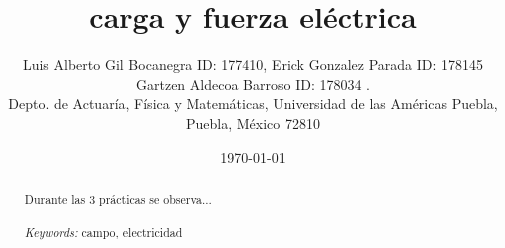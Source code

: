 \documentclass{article}
\begin{document}

\renewcommand{\footrulewidth}{1pt}
\renewcommand{\tablename}{Tabla}
\renewcommand{\figurename}{Figura}


\title{carga y fuerza eléctrica}
\author{\small{Luis Alberto Gil Bocanegra ID: 177410, Erick Gonzalez Parada ID: 178145}\\
 \small{Gartzen Aldecoa Barroso ID: 178034 .}\\		%
	   \small{Depto. de Actuaría, Física y Matemáticas, Universidad de las Américas Puebla, Puebla, M\'exico 72810}}
\date{\small{\today}}

\maketitle


\begin{abstract}
	Durante las 3 prácticas se observa...	
\\
\\
{\it Keywords:}  campo, electricidad  
\\
\\
\end{abstract}

\end{document}
